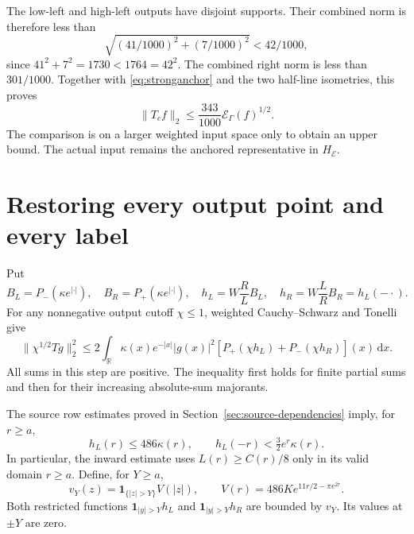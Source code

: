 \documentclass[11pt]{article}
\theoremstyle{remark}\newtheorem{remark}[theorem]{Remark}
\newcommand{\R}{\mathbb R}
\newcommand{\E}{\mathcal E}
\newcommand{\dd}{\,\mathrm d}
\newcommand{\norm}[1]{\lVert #1\rVert}
\numberwithin{equation}{section}
\begin{document}
The low-left and high-left outputs have disjoint supports. Their combined norm is therefore less than
\[
 \sqrt{(41/1000)^2+(7/1000)^2}<42/1000,
\]
since $41^2+7^2=1730<1764=42^2$.
The combined right norm is less than $301/1000$.
Together with \eqref{eq:stronganchor} and the two half-line isometries, this proves
\begin{equation}\label{eq:corebound}
 \norm{T_cf}_2\le\frac{343}{1000}\E_\Gamma(f)^{1/2}.
\end{equation}
The comparison is on a larger weighted input space only to obtain an upper bound. The actual input remains the anchored representative in $H_\E$.

\section{Restoring every output point and every label}\label{sec:tails}
Put
\begin{equation}\label{eq:h}
 B_L=P_-(\kappa e^{|\cdot|}),\quad B_R=P_+(\kappa e^{|\cdot|}),\quad
 h_L=W\frac RL B_L,\quad h_R=W\frac LR B_R=h_L(-\cdot).
\end{equation}
For any nonnegative output cutoff $\chi\le1$, weighted Cauchy--Schwarz and Tonelli give
\begin{equation}\label{eq:transpose}
 \norm{\chi^{1/2}Tg}_2^2
 \le2\int_\R\kappa(x)e^{-|x|}|g(x)|^2
       [P_+(\chi h_L)+P_-(\chi h_R)](x)\dd x.
\end{equation}
All sums in this step are positive. The inequality first holds for finite partial sums and then for their increasing absolute-sum majorants.

The source row estimates proved in Section~\ref{sec:source-dependencies} imply, for $r\ge a$,
\begin{equation}\label{eq:hrow}
 h_L(r)\le486\kappa(r),\qquad
 h_L(-r)<\tfrac32e^r\kappa(r).
\end{equation}
In particular, the inward estimate uses $L(r)\ge C(r)/8$ only in its valid domain $r\ge a$. Define, for $Y\ge a$,
\begin{equation}\label{eq:V}
 v_Y(z)=\mathbf1_{\{|z|>Y\}}V(|z|),\qquad
 V(r)=486K e^{11r/2-\pi e^{2r}}.
\end{equation}
Both restricted functions $\mathbf1_{|y|>Y}h_L$ and
$\mathbf1_{|y|>Y}h_R$ are bounded by $v_Y$. Its values at $\pm Y$ are zero.
\end{document}
